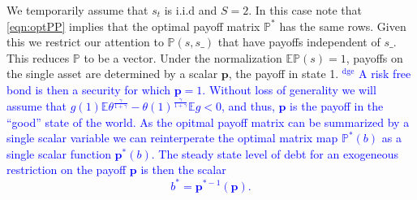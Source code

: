 \documentclass[12pt]{article}
\newcommand{\dge}[1]{\textcolor{blue}{$^{\textrm{dge}}${#1}}}
\newcommand{\EE}{\mathbb E}
\begin{document}
We temporarily assume that $s_t$ is i.i.d and  $S=2$.  In this case note that \eqref{eqn:optPP} implies that the optimal payoff matrix $\mathbb{P}^*$ has the same rows. Given this we restrict our attention to $\mathbb{P}(s,s\_)$ that have payoffs independent of $s\_$. This reduces $\mathbb{P}$ to be  a vector.
 Under the normalization  $\mathbb{E}\mathbb{P}(s)=1$, payoffs on the single asset are  determined by a  scalar $\bm{p}$, the payoff in state 1. \dge{  A risk free bond is then a security for which $\bm{p} = 1$.  Without loss of generality we will assume that $ g(1)\EE\theta^\frac{\gamma}{1+\gamma}-\theta(1)^\frac\gamma{1+\gamma} \mathbb{E}g <0$, and thus, $\bm p$ is the payoff in the ``good'' state of the world.  As the opitmal payoff matrix can be summarized by a single scalar variable we can reinterperate the optimal matrix map $\mathbb P^*(b)$ as a single scalar function $\bm p^*(b)$.  The steady state level of debt for an exogeneous restriction on the payoff $\bm p$ is then the scalar 
\begin{equation}
\label{eq-ss}
 b^* =  {\bm p}^{* -1}(\bm{p}).
\end{equation}}
\end{document}
